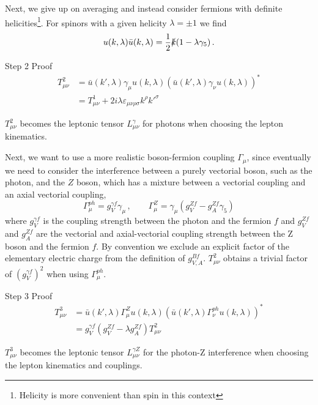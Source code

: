 Next, we give up on averaging and instead consider fermions with definite helicities\footnote{Helicity is more convenient than spin in this context}.
For spinors with a given helicity $\lambda = \pm 1$ we find
\begin{equation}
    u(k,\lambda) \bar u(k,\lambda) = \frac 1 2 \slashed k (1 - \lambda \gamma_5) \,.
\end{equation}
\begin{exercisebox}[label=box:exLOT2]{Step 2}
    Proof
    \begin{align}
        T^2_{\mu\nu} &= \bar u(k',\lambda)\gamma_\mu u(k,\lambda) \left(\bar u(k',\lambda)\gamma_\nu u(k,\lambda)\right)^*\\
         &= T^1_{\mu\nu} + 2 i \lambda \varepsilon_{\mu\nu\rho\sigma} k^\rho k'^\sigma
    \end{align}
\end{exercisebox}
\noindent{}$T^2_{\mu\nu}$ becomes the leptonic tensor $L_{\mu\nu}^\gamma$ for photons when choosing the lepton kinematics.

Next, we want to use a more realistic boson-fermion coupling $\Gamma_\mu$, since eventually we need to consider the interference between a purely vectorial boson, such as the photon, and the $Z$ boson, which has a mixture between a vectorial coupling and an axial vectorial coupling,
\begin{equation}
    \Gamma^{ph}_\mu = g_V^{\gamma f}\gamma_\mu\,, \qquad \Gamma^Z_\mu = \gamma_\mu(g_V^{Z f} - g_A^{Z f} \gamma_5)
\end{equation}
where $g_V^{\gamma f}$ is the coupling strength between the photon and the fermion $f$ and $g_V^{Z f}$ and $g_A^{Z f}$ are the vectorial and axial-vectorial coupling strength between the Z boson and the fermion $f$.
By convention we exclude an explicit factor of the elementary electric charge from the definition of $g_{V,A}^{B f}$.
$T^2_{\mu\nu}$ obtains a trivial factor of $(g_V^{\gamma f})^2$ when using $\Gamma^{ph}_\mu$.
\begin{exercisebox}[label=box:exLOT3]{Step 3}
    Proof
    \begin{align}
        T^3_{\mu\nu} &= \bar u(k',\lambda)\Gamma^Z_\mu u(k,\lambda) \left(\bar u(k',\lambda)\Gamma^{ph}_\nu u(k,\lambda)\right)^*\\
         &= g_V^{\gamma f}(g_V^{Z f} - \lambda g_A^{Z f})T^2_{\mu\nu}
    \end{align}
\end{exercisebox}
\noindent{}$T^3_{\mu\nu}$ becomes the leptonic tensor $L_{\mu\nu}^{\gamma Z}$ for the photon-Z interference when choosing the lepton kinematics and couplings.

